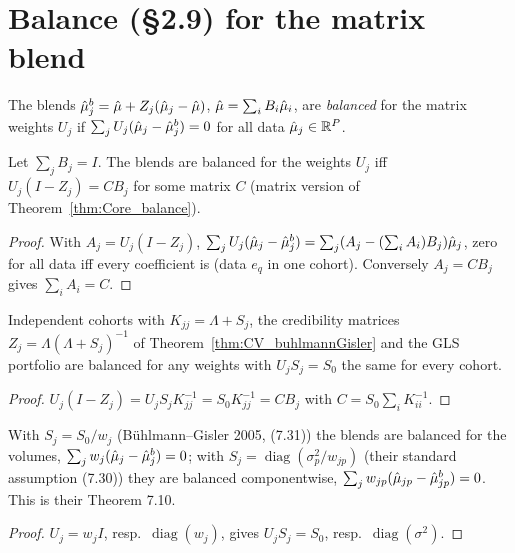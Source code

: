 \section*{Balance (\S2.9) for the matrix blend}

\begin{definition}\label{def:CV_balanced}
  \leanok
  The blends $\hat\mu_j^b = \hat\mu + Z_j(\hat\mu_j - \hat\mu)$, $\hat\mu = \sum_i B_i\hat\mu_i$, are
  \emph{balanced} for the matrix weights $U_j$ if
  $\sum_j U_j(\hat\mu_j - \hat\mu_j^b) = 0$ for all data $\hat\mu_j \in \mathbb{R}^P$.
\end{definition}

\begin{theorem}\label{thm:CV_balance}
  \leanok
  Let $\sum_j B_j = I$. The blends are balanced for the weights $U_j$ iff
  $U_j(I - Z_j) = CB_j$ for some matrix $C$ (matrix version of
  Theorem~\ref{thm:Core_balance}).
\end{theorem}
\begin{proof}
  \leanok
  With $A_j = U_j(I - Z_j)$,
  $\sum_j U_j(\hat\mu_j - \hat\mu_j^b) = \sum_j (A_j - (\sum_i A_i)B_j)\hat\mu_j$, zero for all data
  iff every coefficient is (data $e_q$ in one cohort). Conversely $A_j = CB_j$ gives
  $\sum_i A_i = C$.
\end{proof}

\begin{theorem}\label{thm:CV_balance_noise}
  \leanok
  Independent cohorts with $K_{jj} = \Lambda + S_j$, the credibility matrices
  $Z_j = \Lambda(\Lambda + S_j)^{-1}$ of Theorem~\ref{thm:CV_buhlmannGisler} and the GLS
  portfolio are balanced for any weights with $U_jS_j = S_0$ the same for every cohort.
\end{theorem}
\begin{proof}
  \leanok
  $U_j(I - Z_j) = U_jS_jK_{jj}^{-1} = S_0K_{jj}^{-1} = CB_j$ with
  $C = S_0\sum_i K_{ii}^{-1}$.
\end{proof}

\begin{corollary}\label{cor:CV_balance_buhlmannGisler}
  \leanok
  With $S_j = S_0/w_j$ (Bühlmann--Gisler 2005, (7.31)) the blends are balanced for the
  volumes, $\sum_j w_j(\hat\mu_j - \hat\mu_j^b) = 0$; with $S_j = \operatorname{diag}(\sigma_p^2/w_{jp})$
  (their standard assumption (7.30)) they are balanced componentwise,
  $\sum_j w_{jp}(\hat\mu_{jp} - \hat\mu_{jp}^b) = 0$. This is their Theorem 7.10.
\end{corollary}
\begin{proof}
  \leanok
  $U_j = w_jI$, resp.\ $\operatorname{diag}(w_j)$, gives $U_jS_j = S_0$, resp.\
  $\operatorname{diag}(\sigma^2)$.
\end{proof}

